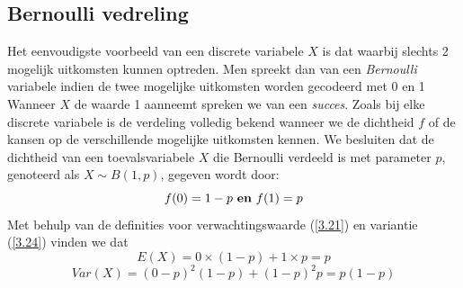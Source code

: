 \documentclass[titlepage]{article}
\numberwithin{equation}{section}
\begin{document}
 \subsection{Bernoulli vedreling}
 Het eenvoudigste voorbeeld van een discrete variabele $X$ is dat waarbij slechts 2 mogelijk uitkomsten kunnen optreden. Men spreekt dan van een \textit{Bernoulli} variabele indien de twee mogelijke uitkomsten worden gecodeerd met 0 en 1 Wanneer $X$ de waarde 1 aanneemt spreken we van een \textit{succes}.\newline\newline
 Zoals bij elke discrete variabele is de verdeling volledig bekend wanneer we de dichtheid $f$ of de kansen op de verschillende mogelijke uitkomsten kennen. We besluiten dat de dichtheid van een toevalsvariabele $X$ die Bernoulli verdeeld is met parameter $p$, genoteerd als $X\sim B(1,p)$, gegeven wordt door:
 \begin{equation*}
 	f(0) = 1-p \text{ \textbf{en} } f(1)=p
 \end{equation*}
 Met behulp van de definities voor verwachtingswaarde (\ref{3.21}) en variantie (\ref{3.24}) vinden we dat
 \begin{equation}
 	E(X) = 0 \times (1-p)+1 \times p = p
 	\label{4.1}
 \end{equation}
 \begin{equation}
 	Var(X) = (0-p)^2(1-p)+(1-p)^2p=p(1-p)
 	\label{4.2}
 \end{equation}
\end{document}

